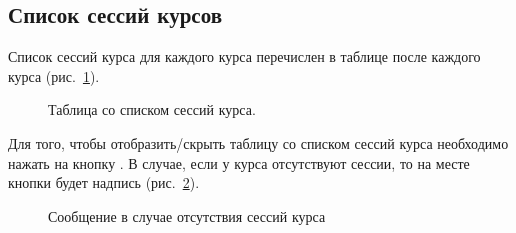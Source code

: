 \subsection{Список сессий курсов}
\label{course_session:course_session_list}
	Список сессий курса для каждого курса перечислен в таблице после каждого курса (рис.~\ref{img:course_session:course_session_table}).
	\begin{figure}[H]
		\caption{Таблица со списком сессий курса.}
		\label{img:course_session:course_session_table}
	\end{figure}
	
	Для того, чтобы отобразить/скрыть таблицу со списком сессий курса необходимо нажать на кнопку . В случае, если у курса отсутствуют сессии, то на месте кнопки  будет надпись  (рис.~\ref{img:course_session:course_without_sessions}).
		\begin{figure}[H]
			\caption{Сообщение в случае отсутствия сессий курса}
			\label{img:course_session:course_without_sessions}
		\end{figure}
		
